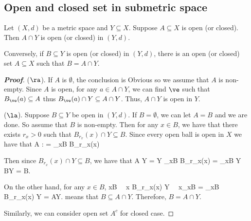 \subsection{Open and closed set in submetric space}

\begin{theorem}\label{thm:open_closed_subset_in_submetric_space_open_closed}
Let $(X,d)$ be a metric space and $Y\subseteq X$. Suppose $A\subseteq X$ is open (or closed). Then $A\cap Y$ is open (or closed) in $(Y,d)$.

Conversely, if $B\subseteq Y$ is open (or closed) in $(Y,d)$, there is an open (or closed) set $A\subseteq X$ such that $B = A\cap Y$.
\end{theorem}

\begin{proof}[\bf Proof]
($\ra$). If $A$ is $\emptyset$, the conclusion is Obvious so we assume that $A$ is non-empty. Since $A$ is open, for any $a\in A\cap Y$, we can find $\ve$ such that $B_\ve(a)\subseteq A$ thus $B_\ve(a) \cap Y \subseteq A\cap Y$. Thus, $A\cap Y$ is open in $Y$.

($\la$). Suppose $B\subseteq Y$ be open in $(Y,d)$. If $B= \emptyset$, we can let $A = B$ and we are done. So assume that $B$ is non-empty. Then for any $x\in B$, we have that there exists $r_x>0$ such that $B_{r_x}(x) \cap Y \subseteq B$. Since every open ball is open in $X$ we have that
\be
A : = \bigcup_{x\in B} B_{r_x}(x) \quad {}
\ee

Then since $B_{r_x}(x) \cap Y \subseteq B$, we have that
\be
A \cap Y =  Y \cap \bigcup_{x\in B} B_{r_x}(x) = \bigcup_{x\in B}  \cap Y \subseteq B\cap Y = B.
\ee

On the other hand, for any $x\in B$,
\be
x\in B \ \ra\ x \in B_{r_x}(x) \cap Y \ \ra\ x\in \bigcup_{x\in B}  = \bigcup_{x\in B} B_{r_x}(x) \cap Y = A\cap Y.
\ee
means that $B \subseteq A\cap Y$. Therefore, $B = A\cap Y$. %
%
%

Similarly, we can consider open set $A^c$ for closed case.
\end{proof}






